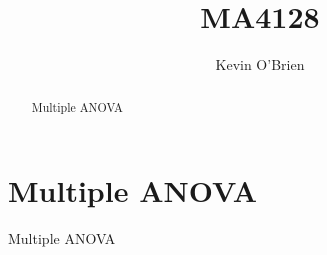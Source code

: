 \documentclass[12pt]{article}
\title{MA4128}
\author{Kevin O'Brien}
\begin{document}
\maketitle

\begin{abstract}
Multiple ANOVA
\end{abstract}

\section{Multiple ANOVA}
Multiple ANOVA
\end{document}
